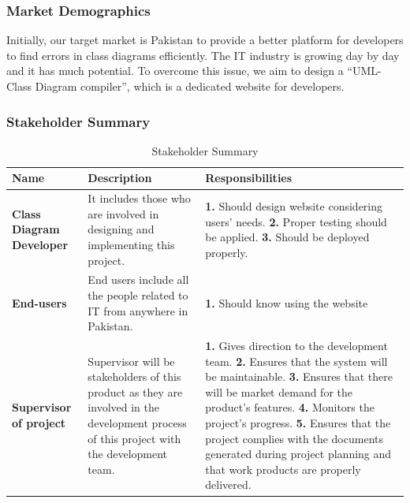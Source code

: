 \documentclass[12pt,a4paper]{article}
\begin{document}
\subsubsection{Market Demographics}
	Initially, our target market is Pakistan to provide a better platform for developers to find errors in class diagrams efficiently. The IT industry is growing day by day and it has much potential. To overcome this issue, we aim to design a “UML-Class Diagram compiler”, which is a dedicated website for developers.
\newpage	
\subsubsection{Stakeholder Summary}
\begin{table}[h!]
\caption{Stakeholder Summary}
    \centering
    \begin{tabular}{|p{3cm}|p{7cm}|p{5cm}|}
    \hline
       \textbf{Name}  &\textbf{Description} &\textbf{Responsibilities}  \\%
       \hline
         \textbf{Class Diagram Developer}&It includes those who are involved in designing and implementing this project.&
         \newline \textbf{1.} Should design website considering users’ needs.
         \newline \textbf{2.} Proper testing should be applied.
         \newline \textbf{3.} Should be deployed properly.\\%
         \hline
         \textbf{End-users}&End users include all the people related to IT from anywhere in Pakistan.&
         \textbf{1.} Should know using the website\\%
         \hline
         \textbf{Supervisor of project}&Supervisor will be stakeholders of this product as they are involved in the development process of this project with the development team.& 
        \newline\textbf{1.} Gives direction to the development team.
         \newline\textbf{2.} Ensures that the system will be maintainable.
         \newline\textbf{3.} Ensures that there will be market demand for the product’s features.
         \newline\textbf{4.} Monitors the project’s progress.
         \newline\textbf{5.} Ensures that the project complies with the documents generated during project planning and that work products are properly delivered.\\%
         \hline
    \end{tabular}
\end{table}
\end{document}
